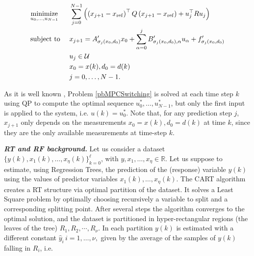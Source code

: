 \begin{problem}\label{pbMPCSwitching}
	\small
	\vspace{-0.3cm}
	\begin{equation*}
		\begin{aligned}
			& \underset{u_0,\ldots,u_{N-1}}{\text{minimize}} & &  \sum_{j=0}^{N-1} \left(\left(x_{j+1}-x_{\mathrm{ref}}\right)^\top Q \left(x_{j+1}-x_{\mathrm{ref}}\right) + u^\top_{j} R u_{j}\right)\\
			& \text{subject to }            & &  x_{j+1} = A'_{\sigma_j(x_{0},d_{0})} x_0 + \sum_{\alpha = 0}^{j}B'_{\sigma_{j}(x_{0},d_{0}),\alpha} u_\alpha + f'_{\sigma_j(x_{0},d_{0})}\\       
			&                               & &  u_{j}   \in \mathcal{U}\\
			&                               & &  x_{0} = x(k), d_{0} = d(k)\\ 
			&                               & &  j = 0,\ldots,N-1.			\\
		\end{aligned}
		\vspace{0.1cm}
	\end{equation*}
	\normalsize
\end{problem}
\noindent As it is well known \cite{borrelli2017predictive}, Problem \ref{pbMPCSwitching} is solved at each time step $k$ using QP to compute the optimal sequence $u^*_0,\ldots,u^*_{N-1}$, but only the first input is applied to the system, i.e. $u(k) = u^*_0$. Note that, for any prediction step $j$, $x_{j+1}$ only depends on the measurements $x_0=x(k),d_0=d(k)$ at time $k$, since they are the only available measurements at time-step $k$. 


\textbf{\emph{RT and RF background.}} Let us consider a dataset $\{y(k),x_1(k),\ldots,x_\eta(k)\}_{k=0}^\ell$, with $y,x_1,\ldots,x_\eta\in\mathbb{R}$. Let us suppose  to estimate, using Regression Trees, the prediction of the (response) variable $y(k)$ using the values of predictor variables $x_1(k),\ldots,x_\eta(k)$. The CART algorithm \cite{BreimanCART2017} creates a RT structure via optimal partition of the dataset. It solves a Least Square problem by optimally choosing recursively a variable to split and a corresponding splitting point. After several steps the algorithm converges to the optimal solution, and the dataset is partitioned in hyper-rectangular regions (the leaves of the tree) $R_1, R_2,\cdots, R_\nu$. In each partition $y(k)$ is estimated with a different constant $\hat y_i\, i=1,\ldots,\nu,$ given by the average of the samples of $y(k)$ falling in $R_i$, i.e.

